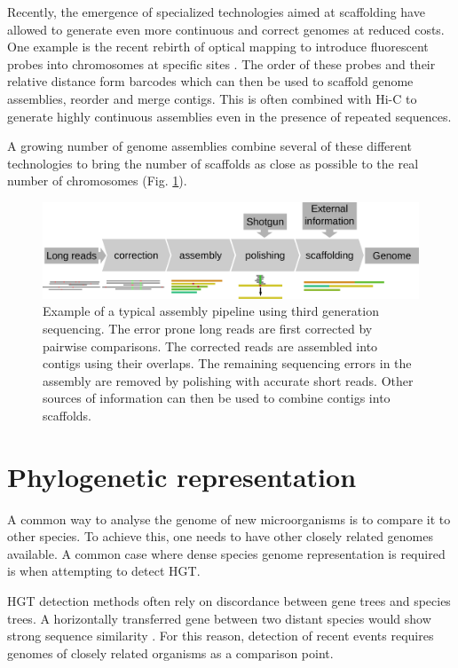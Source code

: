 Recently, the emergence of specialized technologies aimed at scaffolding have allowed to generate even more continuous and correct genomes at reduced costs. One example is the recent rebirth of optical mapping to introduce fluorescent probes into chromosomes at specific sites \cite{lamGenomeMappingNanochannel2012}. The order of these probes and their relative distance form barcodes which can then be used to scaffold genome assemblies, reorder and merge contigs. This is often combined with Hi-C to generate highly continuous assemblies even in the presence of repeated sequences.

A growing number of genome assemblies combine several of these different technologies to bring the number of scaffolds as close as possible to the real number of chromosomes (Fig. \ref{fig:01-03:assembly}).

\begin{figure}[htb]
    \includegraphics[width=\textwidth]{Parts/Part01/gfx/assembly_pipeline.pdf}
    \caption[Example of a third generation sequencing assembly pipeline.]{Example of a typical assembly pipeline using third generation sequencing. The error prone long reads are first corrected by pairwise comparisons. The corrected reads are assembled into contigs using their overlaps. The remaining sequencing errors in the assembly are removed by polishing with accurate short reads. Other sources of information can then be used to combine contigs into scaffolds.}
    \label{fig:01-03:assembly}
\end{figure}

\section{Phylogenetic representation}

A common way to analyse the genome of new microorganisms is to compare it to other species. To achieve this, one needs to have other closely related genomes available. A common case where dense species genome representation is required is when attempting to detect \acrshort{HGT}.

\acrshort{HGT} detection methods often rely on discordance between gene trees and species trees. A horizontally transferred gene between two distant species would show strong sequence similarity \cite{ravenhallInferringHorizontalGene2015}. For this reason, detection of recent events requires genomes of closely related organisms as a comparison point.

